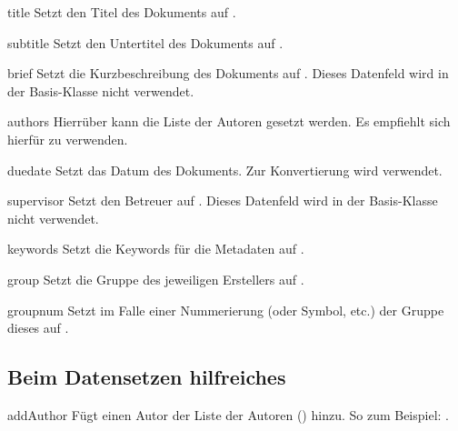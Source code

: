 \documentclass{sopra-base}
\begin{document}
\begin{command}{title}{}
    Setzt den Titel des Dokuments auf .
\end{command}

\begin{command}{subtitle}{}
    Setzt den Untertitel des Dokuments auf .
\end{command}

\begin{command}{brief}{}
    Setzt die Kurzbeschreibung des Dokuments auf .
    Dieses Datenfeld wird in der Basis-Klasse nicht verwendet. 
\end{command}

\begin{command}{authors}{}
    Hierrüber kann die Liste der Autoren gesetzt werden. Es empfiehlt sich
    hierfür  zu verwenden.
\end{command}

\begin{command}{duedate}{}
   Setzt das Datum des Dokuments. Zur Konvertierung wird 
   verwendet. 
\end{command}

\begin{command}{supervisor}{}
    Setzt den Betreuer auf . Dieses Datenfeld wird in der Basis-Klasse nicht verwendet. 
\end{command}

\begin{command}{keywords}{}
    Setzt die Keywords für die Metadaten auf . 
\end{command}

\begin{command}{group}{}
    Setzt die Gruppe des jeweiligen Erstellers auf .
\end{command}

\begin{command}{groupnum}{}
    Setzt im Falle einer Nummerierung (oder Symbol, etc.) der Gruppe dieses
    auf .
\end{command}

\subsection{Beim Datensetzen hilfreiches}
\begin{command}{addAuthor}{}
    Fügt einen Autor der Liste der Autoren () hinzu. So zum
    Beispiel: .
\end{command}
\end{document}

